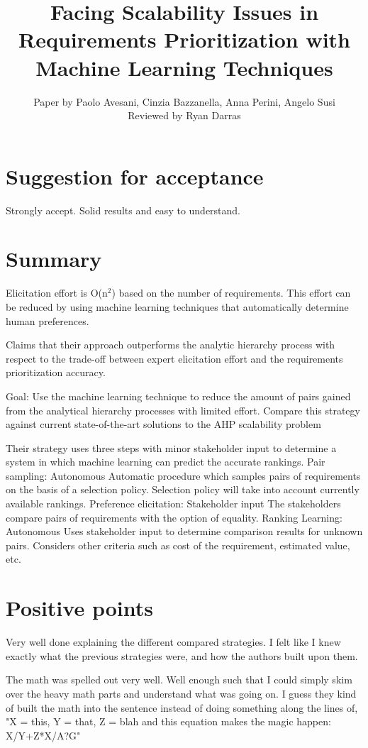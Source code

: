 \documentclass[11pt,twoside]{IEEEtran}
\title{Facing Scalability Issues in Requirements Prioritization with Machine Learning Techniques}
\author{Paper by Paolo Avesani, Cinzia Bazzanella, Anna Perini, Angelo Susi\\Reviewed by Ryan Darras}
\begin{document}
\maketitle

\section{Suggestion for acceptance}
Strongly accept. Solid results and easy to understand.

\section{Summary}
Elicitation effort is O(n$^2$) based on the number of requirements. This effort can be reduced by using machine learning techniques that automatically determine human preferences.

Claims that their approach outperforms the analytic hierarchy process with respect to the trade-off between expert elicitation effort and the requirements prioritization accuracy.

Goal: Use the machine learning technique to reduce the amount of pairs gained from the analytical hierarchy processes with limited effort. Compare this strategy against current state-of-the-art solutions to the AHP scalability problem

Their strategy uses three steps with minor stakeholder input to determine a system in which machine learning can predict the accurate rankings.
Pair sampling: Autonomous
Automatic procedure which samples pairs of requirements on the basis of a selection policy.
Selection policy will take into account currently available rankings. 
Preference elicitation: Stakeholder input
The stakeholders compare pairs of requirements with the option of equality.
Ranking Learning: Autonomous
Uses stakeholder input to determine comparison results for unknown pairs.
Considers other criteria such as cost of the requirement, estimated value, etc.


\section{Positive points}

Very well done explaining the different compared strategies. I felt like I knew exactly what the previous strategies were, and how the authors built upon them.

The math was spelled out very well. Well enough such that I could simply skim over the heavy math parts and understand what was going on. I guess they kind of built the math into the sentence instead of doing something along the lines of, "X = this, Y = that, Z = blah and this equation makes the magic happen: X/Y+Z*X/A?G"
\end{document}
